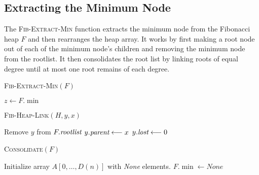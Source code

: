 \subsection{Extracting the Minimum Node}
The \textsc{Fib-Extract-Min} function extracts the minimum node from the Fibonacci heap $F$ and then rearranges the heap array. It works by first making a root node out of each of the minimum node's children and removing the minimum node from the rootlist. It then consolidates the root list by linking roots of equal degree until at most one root remains of each degree.
\begin{center}
	\begin{minipage}{0.45\textwidth}
		\begin{algorithm}[H]
			\caption{\textsc{Fib-Extract-Min}$(F)$}
			\DontPrintSemicolon
			$z\longleftarrow F.\min$\;
		\end{algorithm}
		\vspace{3.6cm}

		\begin{algorithm}[H]
			\caption{\textsc{Fib-Heap-Link}$(H,y,x)$}
			\DontPrintSemicolon
			Remove $y$ from $F.\emph{rootlist}$\;
			$y.\emph{parent}\longleftarrow x$\;
			$y.\emph{lost}\longleftarrow 0$
		\end{algorithm}
	\end{minipage}\hfill
	\begin{minipage}{0.5\textwidth}
		\begin{algorithm}[H]
			\caption{\textsc{Consolidate}$(F)$}
			\DontPrintSemicolon
			Initialize array $A[0,\dots, D(n)]$ with \emph{None} elements.\;
			$F.\min\longleftarrow None$\;
		\end{algorithm}
	\end{minipage}
\end{center}

